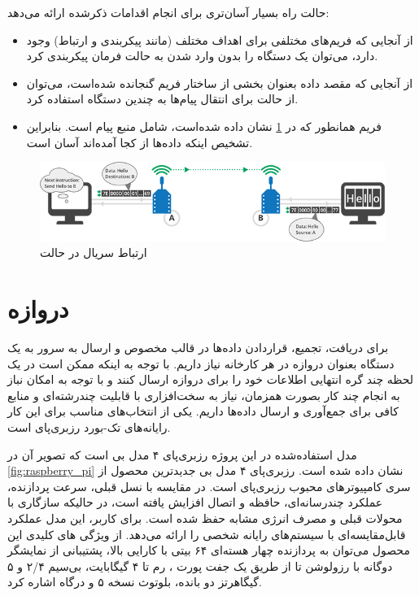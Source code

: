 حالت  راه بسیار آسان‌تری برای انجام اقدامات ذکرشده ارائه می‌دهد:

\begin{itemize}
\item از آنجایی که فریم‌های مختلفی برای اهداف مختلف (مانند پیکربندی و ارتباط) وجود دارد، می‌توان یک دستگاه را بدون وارد شدن به حالت فرمان پیکربندی کرد.
\item از آنجایی که مقصد داده بعنوان بخشی از ساختار فریم  گنجانده شده‌است، می‌توان از حالت  برای انتقال پیام‌ها به چندین دستگاه استفاده کرد. 
\item فریم  همانطور که در \cref{fig:api_mode} \cite{Digi} نشان داده شده‌است، شامل منبع پیام است. بنابراین تشخیص اینکه داده‌ها از کجا آمده‌اند آسان است.
\end{itemize}

\begin{figure}[!h]
\centering\includegraphics[scale=.7]{api_mode.png}
\caption{ارتباط سریال در حالت  \cite{Digi}}\label{fig:api_mode}
\end{figure}

\section{دروازه}

برای دریافت، تجمیع، قراردادن داده‌ها در قالب مخصوص و ارسال به سرور به یک دستگاه بعنوان دروازه در هر کارخانه نیاز داریم. با توجه به اینکه ممکن است در یک لحظه چند گره انتهایی اطلاعات خود را برای دروازه ارسال کنند و با توجه به امکان نباز به انجام چند کار بصورت همزمان، نیاز به سخت‌افزاری با قابلیت چند‌رشته‌ای و منابع کافی برای جمع‌آوری و ارسال داده‌ها داریم. یکی از انتخاب‌های مناسب برای این کار رایانه‌های تک-بورد رزبری‌پای است.

مدل استفاده‌شده در این پروژه رزبری‌پای ۴ مدل بی است که تصویر آن در \cref{fig:raspberry_pi} نشان داده شده است. رزبری‌پای ۴ مدل بی جدیدترین محصول از سری کامپیوترهای محبوب رزبری‌پای است. در مقایسه با نسل قبلی، سرعت پردازنده، عملکرد چندرسانه‌ای، حافظه و اتصال افزایش یافته است، در حالیکه سازگاری با محولات قبلی و مصرف انرژی مشابه حفظ شده است. برای کاربر، این مدل عملکرد قابل‌مقایسه‌ای با سیستم‌های رایانه شخصی  را ارائه می‌دهد. از ویژگی های کلیدی این محصول می‌توان به پردازنده چهار هسته‌ای ۶۴ بیتی با کارایی بالا، پشتیبانی از نمایشگر دوگانه با رزولوشن تا  از طریق یک جفت پورت ، رم تا ۴ گیگابایت، بی‌سیم ۲/۴ و ۵ گیگاهرتز دو بانده، بلوتوث نسخه ۵ و درگاه  اشاره کرد\cite{raspberry}.

